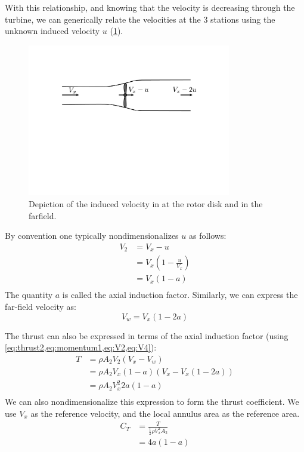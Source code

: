 \documentclass{article}
\begin{document}
With this relationship, and knowing that the velocity is decreasing through the turbine, we can generically relate the velocities at the 3 stations using the unknown induced velocity $u$ (\cref{fig:velocity-deficit}).
\begin{figure}[htbp]
\centering
\includegraphics[width=3.5in]{figures/velocity-deficit1}
\caption{Depiction of the induced velocity in at the rotor disk and in the farfield.}
\label{fig:velocity-deficit}
\end{figure}
By convention one typically nondimensionalizes $u$ as follows:
\begin{equation}
\begin{aligned}
V_2 &= V_x - u\\
&= V_x\left(1 - \frac{u}{V_x}\right)\\
&= V_x\left(1 - a\right)\\
\end{aligned}
\label{eq:V2}
\end{equation}
The quantity $a$ is called the axial induction factor.  Similarly, we can express the far-field velocity as:
\begin{equation}
    V_w = V_x(1 - 2a)
    \label{eq:V4}
\end{equation}

The thrust can also be expressed in terms of the axial induction factor (using \cref{eq:thrust2,eq:momentum1,eq:V2,eq:V4}):
\begin{equation}
\begin{aligned}
    T &= \rho A_2 V_2 (V_x - V_w)\\
    &= \rho A_2 V_x(1-a) (V_x - V_x(1-2a))\\
    &= \rho A_2 V_x^2 2a (1-a) \\
\end{aligned}
\label{eq:momT}
\end{equation}
We can also nondimensionalize this expression to form the thrust coefficient.  We use $V_x$ as the reference velocity, and the local annulus area as the reference area.
\begin{equation}
\begin{aligned}
    C_T &= \frac{T}{\frac{1}{2}\rho V_x^2 A_2}\\
     &= 4 a (1 - a)
    \label{eq:CTmom}
\end{aligned}
\end{equation}
\end{document}
